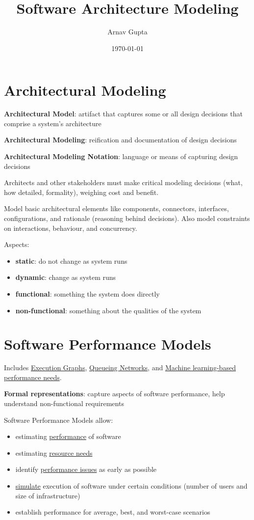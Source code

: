 \documentclass[11pt]{article}
\author{Arnav Gupta}
\date{\today}
\title{Software Architecture Modeling}
\begin{document}
\maketitle
\tableofcontents

\section{Architectural Modeling}
\label{sec:orgd8495da}
\textbf{Architectural Model}: artifact that captures some or all design decisions that
comprise a system's architecture

\textbf{Architectural Modeling}: reification and documentation of design decisions

\textbf{Architectural Modeling Notation}: language or means of capturing design decisions

Architects and other stakeholders must make critical modeling decisions (what, how
detailed, formality), weighing cost and benefit.

Model basic architectural elements like components, connectors, interfaces,
configurations, and rationale (reasoning behind decisions).
Also model constraints on interactions, behaviour, and concurrency.

Aspects:
\begin{itemize}
\item \textbf{static}: do not change as system runs
\item \textbf{dynamic}: change as system runs
\item \textbf{functional}: something the system does directly
\item \textbf{non-functional}: something about the qualities of the system
\end{itemize}
\section{Software Performance Models}
\label{sec:org2919fd1}
Includes \uline{Execution Graphs}, \uline{Queueing Networks}, and
\uline{Machine learning-based performance needs}.

\textbf{Formal representations}: capture aspects of software performance,
help understand non-functional requirements

Software Performance Models allow:
\begin{itemize}
\item estimating \uline{performance} of software
\item estimating \uline{resource needs}
\item identify \uline{performance issues} as early as possible
\item \uline{simulate} execution of software under certain conditions (number of users
and size of infrastructure)
\item establish performance for average, best, and worst-case scenarios
\end{itemize}
\end{document}
